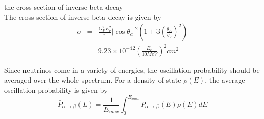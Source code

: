 the cross section of inverse beta decay\\
The cross section of inverse beta decay is given by
\begin{eqnarray*}
\sigma& = &\frac{G_F^2E_\nu^2}{\pi}\vert\cos\theta_c\vert^2\left( 1+3\left( \frac{g_A}{g_\nu}\right)^2 \right)\\
      & = & 9.23 \times 10^{-42} \left( \frac{E_\nu}{10MeV} \right)^2 cm^2
\end{eqnarray*}

Since neutrinos come in a variety of energies, the oscillation probability
should be averaged over the whole spectrum. For a density of state $\rho(E)$,
the average oscillation probability is given by
\[
  \bar{P}_{\alpha \rightarrow \beta}(L)=\frac{1}{E_{max}}\int_0^{E_{max}}P_{\alpha \rightarrow \beta}(E)\rho(E)dE
\]